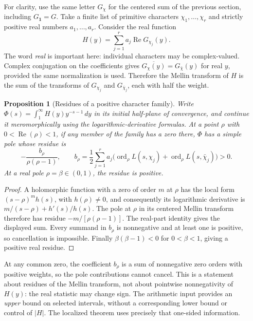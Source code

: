 \documentclass[11pt,openany,oneside]{scrbook}
\newtheorem{proposition}[theorem]{Proposition}
\theoremstyle{definition}
\theoremstyle{remark}
\newcommand{\Rea}{\operatorname{Re}}
\newcommand{\ord}{\operatorname{ord}}
\begin{document}
For clarity, use the same letter $G_\chi$ for the centered sum of the previous section, including $G_{\mathbf1}=G$.  Take a finite list of primitive characters $\chi_1,\ldots,\chi_r$ and strictly positive real numbers $a_1,\ldots,a_r$.  Consider the real function
\begin{equation}\label{eq:positive-real-family}
H(y)=\sum_{j=1}^r a_j\Rea G_{\chi_j}(y).
\end{equation}
The word \emph{real} is important here: individual characters may be complex-valued.  Complex conjugation on the coefficients gives $\overline{G_\chi(y)}=G_{\bar\chi}(y)$ for real $y$, provided the same normalization is used.  Therefore the Mellin transform of $H$ is the sum of the transforms of $G_{\chi_j}$ and $G_{\bar\chi_j}$, each with half the weight.

\begin{proposition}[Residues of a positive character family]\label{prop:positive-poles}
Write $\Phi(s)=\int_1^\infty H(y)y^{-s-1}\,dy$ in its initial half-plane of convergence, and continue it meromorphically using the logarithmic-derivative formulas.  At a point $\rho$ with $0<\Rea(\rho)<1$, if any member of the family has a zero there, $\Phi$ has a simple pole whose residue is
\begin{equation}\label{eq:weighted-residue}
-\frac{b_\rho}{\rho(\rho-1)},\qquad
b_\rho=\frac12\sum_{j=1}^r a_j\bigl(\ord_\rho L(s,\chi_j)+\ord_\rho L(s,\bar\chi_j)\bigr)>0.
\end{equation}
At a real pole $\rho=\beta\in(0,1)$, the residue is positive.
\end{proposition}
\begin{proof}
A holomorphic function with a zero of order $m$ at $\rho$ has the local form $(s-\rho)^m h(s)$, with $h(\rho)\ne0$, and consequently its logarithmic derivative is $m/(s-\rho)+h'(s)/h(s)$.  The pole at $\rho$ in its centered Mellin transform therefore has residue $-m/[\rho(\rho-1)]$.  The real-part identity gives the displayed sum.  Every summand in $b_\rho$ is nonnegative and at least one is positive, so cancellation is impossible.  Finally $\beta(\beta-1)<0$ for $0<\beta<1$, giving a positive real residue.
\end{proof}

At any common zero, the coefficient $b_\rho$ is a sum of nonnegative zero orders with positive weights, so the pole contributions cannot cancel. This is a statement about residues of the Mellin transform, not about pointwise nonnegativity of $H(y)$: the real statistic may change sign. The arithmetic input provides an \emph{upper} bound on selected intervals, without a corresponding lower bound or control of $|H|$. The localized theorem uses precisely that one-sided information.
\end{document}

